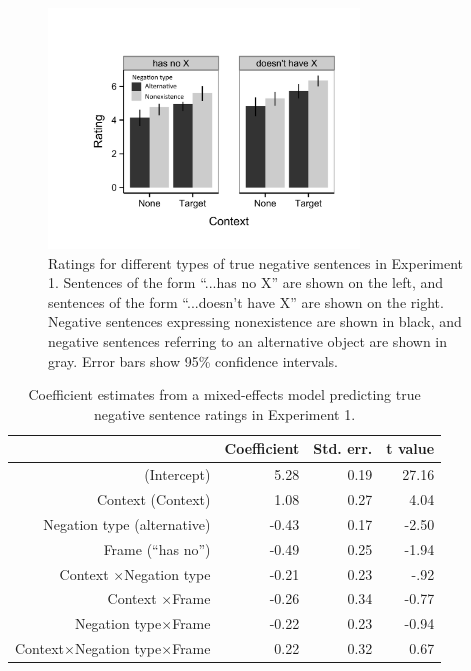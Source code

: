 \documentclass[10pt,letterpaper]{article}
\begin{document}
\begin{figure}
\begin{center} 
\includegraphics[width=3.25in]{figures/study1.pdf}
\caption{\label{fig:s1} Ratings for different types of true negative sentences in Experiment 1.  Sentences of the form ``...has no X'' are shown on the left, and sentences of the form ``...doesn't have X'' are shown on the right.  Negative sentences expressing nonexistence are shown in black, and negative sentences referring to an alternative object are shown in gray.  Error bars show 95\% confidence intervals.}
\vspace{-1cm}
\end{center} 
\end{figure}

\begin{table}[t]
\caption{\label{tab:s1} Coefficient estimates from a mixed-effects model predicting true negative sentence ratings in Experiment 1.}
\begin{center}
\small\addtolength{\tabcolsep}{-5pt}
\begin{tabular}{rrrr}
  \hline
 & Coefficient & Std. err. & t value \\ 
  \hline
(Intercept) & 5.28 & 0.19 & 27.16 \\ 
  Context (Context) & 1.08 & 0.27 & 4.04  \\ 
  Negation type (alternative) & -0.43 & 0.17 & -2.50 \\
  Frame (``has no'') & -0.49 & 0.25 & -1.94 \\ 
  Context $\times$Negation type & -0.21 & 0.23 & -.92 \\
  Context $\times$Frame & -0.26 & 0.34 & -0.77 \\
  Negation type$\times$Frame & -0.22 & 0.23 & -0.94 \\
  Context$\times$Negation type$\times$Frame & 0.22 & 0.32 & 0.67 \\
   \hline
\end{tabular}
\end{center}
\end{table}
\end{document}
